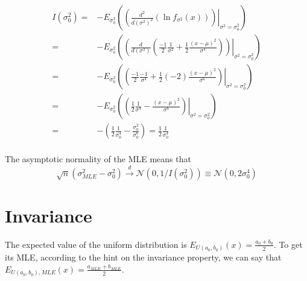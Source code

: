 \documentclass{article}
\begin{document}
\begin{enumerate}[(a)]
          \[\begin{aligned}
                  I\left( {\sigma _0^2} \right) = & - {E_{\sigma _0^2}}\left( {{{\left. {\left( {\frac{{{d^2}}}{{d{{\left( {{\sigma ^2}} \right)}^2}}}\left( {\ln {f_{{\sigma ^2}}}\left( x \right)} \right)} \right)} \right|}_{{\sigma ^2} = \sigma _0^2}}} \right)                                                            \\
                  =                               & - {E_{\sigma _0^2}}\left( {{{\left. {\left( {\frac{d}{{d\left( {{\sigma ^2}} \right)}}\left( {\frac{{ - 1}}{2}\frac{1}{{{\sigma ^2}}} + \frac{1}{2}\frac{{{{\left( {x - \mu } \right)}^2}}}{{{\sigma ^4}}}} \right)} \right)} \right|}_{{\sigma ^2} = \sigma _0^2}}} \right) \\
                  =                               & - {E_{\sigma _0^2}}\left( {{{\left. {\left( {\frac{{ - 1}}{2}\frac{{ - 1}}{{{\sigma ^4}}} + \frac{1}{2}\left( { - 2} \right)\frac{{{{\left( {x - \mu } \right)}^2}}}{{{\sigma ^6}}}} \right)} \right|}_{{\sigma ^2} = \sigma _0^2}}} \right)                                 \\
                  =                               & - {E_{\sigma _0^2}}\left( {{{\left. {\left( {\frac{1}{2}\frac{1}{{{\sigma ^4}}} - \frac{{{{\left( {x - \mu } \right)}^2}}}{{{\sigma ^6}}}} \right)} \right|}_{{\sigma ^2} = \sigma _0^2}}} \right)                                                                           \\
                  =                               & - \left( {\frac{1}{2}\frac{1}{{\sigma _0^4}} - \frac{{\sigma _0^2}}{{\sigma _0^6}}} \right) = \frac{1}{2}\frac{1}{{\sigma _0^4}}                                                                                                                                             \\
              \end{aligned} \]

          The asymptotic normality of the MLE means that
          \[\sqrt n \left( {\sigma _{MLE}^2 - \sigma _0^2} \right)\xrightarrow{d}{\mathcal{N}}\left( {0,1/I\left( {\sigma _0^2} \right)} \right) \equiv {\mathcal{N}}\left( {0,2\sigma _0^4} \right)\]

          \section{Invariance}
          The expected value of the uniform distribution is ${E_{U\left( {{a_0},{b_0}} \right)}}\left( x \right) = \frac{{{a_0} + {b_0}}}{2}$.
          To get its MLE, according to the hint on the invariance property, we can say that ${E_{U\left( {{a_0},{b_0}} \right),MLE}}\left( x \right) = \frac{{{a_{MLE}} + {b_{MLE}}}}{2}$.


\end{enumerate}
\end{document}
